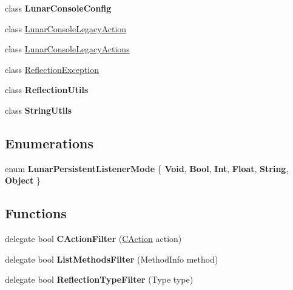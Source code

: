 \begin{DoxyCompactItemize}
class {\bfseries Lunar\+Console\+Config}
\item 
class \mbox{\hyperlink{class_lunar_console_plugin_internal_1_1_lunar_console_legacy_action}{Lunar\+Console\+Legacy\+Action}}
\item 
class \mbox{\hyperlink{class_lunar_console_plugin_internal_1_1_lunar_console_legacy_actions}{Lunar\+Console\+Legacy\+Actions}}
\item 
class \mbox{\hyperlink{class_lunar_console_plugin_internal_1_1_reflection_exception}{Reflection\+Exception}}
\item 
class {\bfseries Reflection\+Utils}
\item 
class {\bfseries String\+Utils}
\end{DoxyCompactItemize}
\subsection*{Enumerations}
\begin{DoxyCompactItemize}
\item 
\mbox{\label{namespace_lunar_console_plugin_internal_a2b9136b3eb8b22f79ce13822080caefb}} 
enum {\bfseries Lunar\+Persistent\+Listener\+Mode} \{ \newline
{\bfseries Void}, 
{\bfseries Bool}, 
{\bfseries Int}, 
{\bfseries Float}, 
\newline
{\bfseries String}, 
{\bfseries Object}
 \}
\end{DoxyCompactItemize}
\subsection*{Functions}
\begin{DoxyCompactItemize}
\item 
\mbox{\label{namespace_lunar_console_plugin_internal_a51377358d7e5eb34332688e47946a474}} 
delegate bool {\bfseries C\+Action\+Filter} (\mbox{\hyperlink{class_lunar_console_plugin_internal_1_1_c_action}{C\+Action}} action)
\item 
\mbox{\label{namespace_lunar_console_plugin_internal_a1f957e64e44400138a8727aba3bde1c0}} 
delegate bool {\bfseries List\+Methods\+Filter} (Method\+Info method)
\item 
\mbox{\label{namespace_lunar_console_plugin_internal_a484546f255065ee9fddde8398dd3d447}} 
delegate bool {\bfseries Reflection\+Type\+Filter} (Type type)
\end{DoxyCompactItemize}
